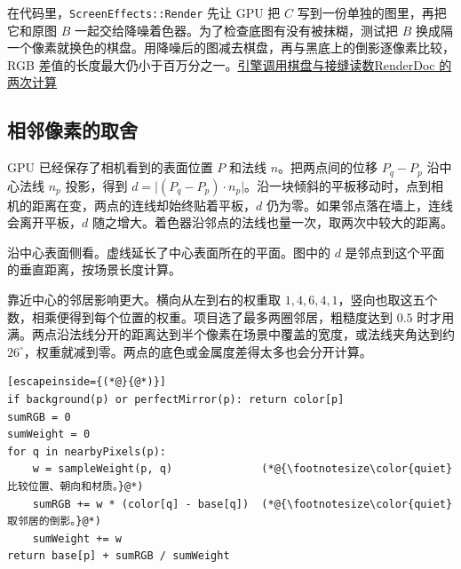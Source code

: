 在代码里，\texttt{ScreenEffects::Render} 先让 GPU 把 $C$ 写到一份单独的图里，再把它和原图 $B$ 一起交给降噪着色器。为了检查底图有没有被抹糊，测试把 $B$ 换成隔一个像素就换色的棋盘。用降噪后的图减去棋盘，再与黑底上的倒影逐像素比较，RGB 差值的长度最大仍小于百万分之一。\href{run:../../Redflag/src/Redflag/Renderer/ScreenSpace/ScreenEffects.cpp}{引擎调用}\quad\href{run:../profiling/rough-reflections/test-edges.csv}{棋盘与接缝读数}\quad\href{run:../profiling/rough-reflections/test-capture.json}{RenderDoc 的两次计算}

\clearpage
\subsection{相邻像素的取舍}

GPU 已经保存了相机看到的表面位置 $P$ 和法线 $n$。把两点间的位移 $P_q-P_p$ 沿中心法线 $n_p$ 投影，得到 $d=\lvert (P_q-P_p)\cdot n_p\rvert$。沿一块倾斜的平板移动时，点到相机的距离在变，两点的连线却始终贴着平板，$d$ 仍为零。如果邻点落在墙上，连线会离开平板，$d$ 随之增大。着色器沿邻点的法线也量一次，取两次中较大的距离。

\begin{center}
\end{center}
{\small\color{quiet}沿中心表面侧看。虚线延长了中心表面所在的平面。图中的 $d$ 是邻点到这个平面的垂直距离，按场景长度计算。\par}

靠近中心的邻居影响更大。横向从左到右的权重取 $1,4,6,4,1$，竖向也取这五个数，相乘便得到每个位置的权重。项目选了最多两圈邻居，粗糙度达到 $0.5$ 时才用满。两点沿法线分开的距离达到半个像素在场景中覆盖的宽度，或法线夹角达到约 $26^\circ$，权重就减到零。两点的底色或金属度差得太多也会分开计算。

\par\nopagebreak
\begin{lstlisting}[escapeinside={(*@}{@*)}]
if background(p) or perfectMirror(p): return color[p]
sumRGB = 0
sumWeight = 0
for q in nearbyPixels(p):
    w = sampleWeight(p, q)              (*@{\footnotesize\color{quiet}比较位置、朝向和材质。}@*)
    sumRGB += w * (color[q] - base[q])  (*@{\footnotesize\color{quiet}取邻居的倒影。}@*)
    sumWeight += w
return base[p] + sumRGB / sumWeight
\end{lstlisting}

